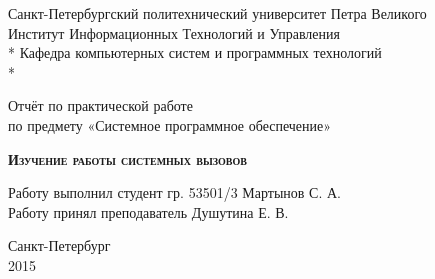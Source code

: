 \begin{titlepage}
\thispagestyle{empty}

\begin{center}
Санкт-Петербургский политехнический университет Петра Великого\\
Институт Информационных Технологий и Управления \\*
Кафедра компьютерных систем и программных технологий \\*
\hrulefill
\end{center}

\vspace{15em}

\begin{center}
\Large Отчёт по практической работе\\по предмету «Системное программное обеспечение» \\
\end{center}

\vspace{1em}

\begin{center}
\textsc{\textbf{Изучение работы системных вызовов}}
\end{center}

\vspace{20em}

\begin{flushleft}
Работу выполнил студент гр. 53501/3 \hrulefill Мартынов С. А. \\
\vspace{1.5em}
Работу принял преподаватель \hrulefill Душутина Е. В. \\
\end{flushleft}

\vspace{\fill}

\begin{center}
Санкт-Петербург \\
2015
\end{center}

\end{titlepage}
\setcounter{page}{2}